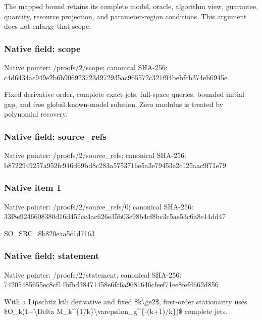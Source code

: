 \documentclass[10pt,a4paper]{article}
\begin{document}
\begingroup\raggedright\sloppy The mapped bound retains its complete model,\allowbreak{} oracle,\allowbreak{} algorithm view,\allowbreak{} guarantee,\allowbreak{} quantity,\allowbreak{} resource projection,\allowbreak{} and parameter-region conditions. This argument does not enlarge that scope.\par\endgroup

\subsubsection{Native field: scope}
Native pointer: /proofs/2/scope; canonical SHA-256: c4d6434ac949e2b6b906923723d972935ac965572c321f94bebfcb374eb6945e

\begingroup\raggedright\sloppy Fixed derivative order,\allowbreak{} complete exact jets,\allowbreak{} full-space queries,\allowbreak{} bounded initial gap,\allowbreak{} and free global known-model solution. Zero modulus is treated by polynomial recovery.\par\endgroup

\subsubsection{Native field: source\_\allowbreak{}refs}
Native pointer: /proofs/2/source\_\allowbreak{}refs; canonical SHA-256: b8722949257a952fc946d69bd8c283a5753716e5a3e79453e2c125aac9f71e79

\subsubsection{Native item 1}
Native pointer: /proofs/2/source\_\allowbreak{}refs/0; canonical SHA-256: 33f8e9246608380d16d457cc4ac626e35b03c98b4cf8bc3c5ae53c6a8e14dd47

\begingroup\raggedright\sloppy SO\_\allowbreak{}SRC\_\allowbreak{}8b820eaa5c1d7163\par\endgroup

\subsubsection{Native field: statement}
Native pointer: /proofs/2/statement; canonical SHA-256: 74205485655ec8cf14bfbd38471458e6fc6a9681646cfeef71ee8fefd662d856

\begingroup\raggedright\sloppy With a Lipschitz kth derivative and fixed \$k\textbackslash{}ge2\$,\allowbreak{} first-order stationarity uses \$O\_\allowbreak{}k(1+\textbackslash{}Delta M\_\allowbreak{}k\textasciicircum{}\{1/\allowbreak{}k\}\textbackslash{}varepsilon\_\allowbreak{}g\textasciicircum{}\{-(k+1)/\allowbreak{}k\})\$ complete jets.\par\endgroup
\end{document}
